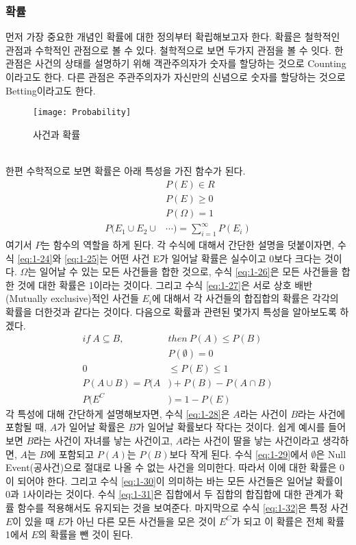 \documentclass[a4paper]{oblivoir}
\begin{document}
\subsubsection{확률}
\indent 먼저 가장 중요한 개념인 확률에 대한 정의부터 확립해보고자 한다. 확률은 철학적인 관점과 수학적인 관점으로 볼 수 있다. 철학적으로 보면 두가지 관점을 볼 수 잇다. 한 관점은 사건의 상태를 설명하기 위해 객관주의자가 숫자를 할당하는 것으로 Counting이라고도 한다. 다른 관점은 주관주의자가 자신만의 신념으로 숫자를 할당하는 것으로 Betting이라고도 한다.\\
\begin{figure}[ht]\centering
\texttt{[image: Probability]}\caption{사건과 확률}\label{Fig:1-22}
\end{figure}\\
\indent 한편 수학적으로 보면 확률은 아래 특성을 가진 함수가 된다.
\begin{align}
&P(E)\in R\label{eq:1-24}\\
&P(E)\geq 0\label{eq:1-25}\\
&P(\Omega)=1\label{eq:1-26}\\
P({E_1}\cup{E_2}\cup&\cdots)=\sum_{i=1}^{\infty} P(E_i)\label{eq:1-27}
\end{align}
\indent 여기서 $P$는 함수의 역할을 하게 된다. 각 수식에 대해서 간단한 설명을 덧붙이자면, 수식 \eqref{eq:1-24}와 \eqref{eq:1-25}는 어떤 사건 E가 일어날 확률은 실수이고 0보다 크다는 것이다. $\Omega$는 일어날 수 있는 모든 사건들을 합한 것으로, 수식 \eqref{eq:1-26}은 모든 사건들을 합한 것에 대한 확률은 1이라는 것이다. 그리고 수식 \eqref{eq:1-27}은 서로 상호 배반(Mutually exclusive)적인 사건들 $E_i$에 대해서 각 사건들의 합집합의 확률은 각각의 확률을 더한것과 같다는 것이다. 다음으로 확률과 관련된 몇가지 특성을 알아보도록 하겠다.
\begin{align}
if\ A\subseteq B,\ &then\ P(A)\leq P(B)\label{eq:1-28}\\
&P(\emptyset)=0\label{eq:1-29}\\
0&\leq P(E)\leq1\label{eq:1-30}\\
P(A\cup B)=P(A&)+P(B)-P(A\cap B)\label{eq:1-31}\\
P(E^C&)=1-P(E)\label{eq:1-32}
\end{align}
\indent 각 특성에 대해 간단하게 설명해보자면, 수식 \eqref{eq:1-28}은 $A$라는 사건이 $B$라는 사건에 포함될 때, $A$가 일어날 확률은 $B$가 일어날 확률보다 작다는 것이다. 쉽게 예시를 들어보면 $B$라는 사건이 자녀를 낳는 사건이고, $A$라는 사건이 딸을 낳는 사건이라고 생각하면, $A$는 $B$에 포함되고 $P(A)$는 $P(B)$보다 작게 된다. 수식 \eqref{eq:1-29}에서 $\emptyset$은 Null Event(공사건)으로 절대로 나올 수 없는 사건을 의미한다. 따라서 이에 대한 확률은 0이 되어야 한다. 그리고 수식 \eqref{eq:1-30}이 의미하는 바는 모든 사건들은 일어날 확률이 0과 1사이라는 것이다. 수식 \eqref{eq:1-31}은 집합에서 두 집합의 합집합에 대한 관계가 확률 함수를 적용해서도 유지되는 것을 보여준다. 마지막으로 수식 \eqref{eq:1-32}은 특정 사건 $E$이 있을 때 $E$가 아닌 다른 모든 사건들을 모은 것이 $E^C$가 되고 이 확률은 전체 확률 1에서 $E$의 확률을 뺀 것이 된다.\\
\end{document}
